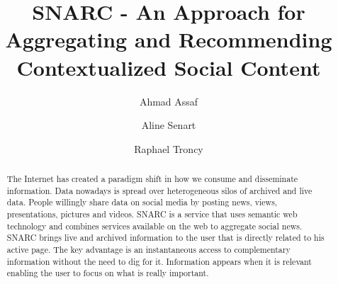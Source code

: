 \documentclass[oribibl]{llncs}
\begin{document}
\title{SNARC - An Approach for Aggregating and Recommending Contextualized Social Content} 
\author{Ahmad Assaf \and Aline Senart \and Raphael Troncy} 
\maketitle

\begin{abstract}
The Internet has created a paradigm shift in how we consume and disseminate information. Data nowadays is spread over heterogeneous silos of archived and live data. People willingly share data on social media by posting news, views, presentations, pictures and videos. SNARC is a service that uses semantic web technology and combines services available on the web to aggregate social news. SNARC brings live and archived information to the user that is directly related to his active page. The key advantage is an instantaneous access to complementary information without the need to dig for it. Information appears when it is relevant enabling the user to focus on what is really important.
\end{abstract}
\end{document}
